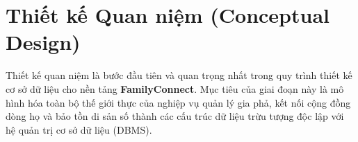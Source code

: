\chapter{Thiết kế Quan niệm (Conceptual Design)}
\label{chap:chuong1_quan_niem}

Thiết kế quan niệm là bước đầu tiên và quan trọng nhất trong quy trình thiết kế cơ sở dữ liệu cho nền tảng \textbf{FamilyConnect}. Mục tiêu của giai đoạn này là mô hình hóa toàn bộ thế giới thực của nghiệp vụ quản lý gia phả, kết nối cộng đồng dòng họ và bảo tồn di sản số thành các cấu trúc dữ liệu trừu tượng độc lập với hệ quản trị cơ sở dữ liệu (DBMS).




